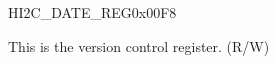 \begin{register}{H}{I2C\_DATE\_REG}{0x00F8}\label{regdesc:I2CDATEREG}
%
\regnewline%
\begin{regdesc}\begin{reglist}
\label{fielddesc:I2CDATE}\item [I2C\_DATE] This is the version control register. (R/W)
\end{reglist}\end{regdesc}
\end{register}
